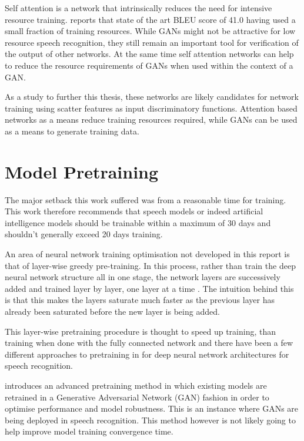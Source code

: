 Self attention is a network that intrinsically reduces the need for intensive resource training.  \cite{vaswani2017attention} reports that state of the art BLEU score of 41.0 having used a small fraction of training resources.  While GANs might not be attractive for low resource speech recognition, they still remain an important tool for verification of the output of other networks.  At the same time self attention networks can help to reduce the resource requirements of GANs when used within the context of a GAN.

As a study to further this thesis, these networks are likely candidates for network training using scatter features as input discriminatory functions.  Attention based networks as a means reduce training resources required, while GANs can be used as a means to generate training data.


\section{Model Pretraining}
The major setback this work suffered was from a reasonable time for training.  This work therefore recommends that speech models or indeed artificial intelligence models should be trainable within a maximum of 30 days and shouldn't generally exceed 20 days training.

An area of neural network training optimisation not developed in this report is that of layer-wise greedy pre-training.  In this process, rather than train the deep neural network structure all in one stage, the network layers are successively added and trained layer by layer, one layer at a time \citep{Goodfellow-et-al-2016}.  The intuition behind this is that this makes the layers saturate much faster as the previous layer has already been saturated before the new layer is being added.

This layer-wise pretraining procedure is thought to speed up training, than training when done with the fully connected network and there have been a few different approaches to pretraining in for deep neural network architectures for speech recognition. 

\cite{hendrycks2019using} introduces an advanced pretraining method in which existing models are retrained in a Generative Adversarial Network (GAN) fashion in order to optimise performance and model robustness.  This is an instance where GANs are being deployed in speech recognition.  This method however is not likely going to help improve model training convergence time.

